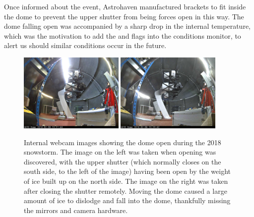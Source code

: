 \begin{colsection}
\begin{colsection}
Once informed about the event, Astrohaven manufactured brackets to fit inside the dome to prevent the upper shutter from being forces open in this way. The dome falling open was accompanied by a sharp drop in the internal temperature, which was the motivation to add the  and  flags into the conditions monitor, to alert us should similar conditions occur in the future.

\begin{figure}[p]
    \begin{center}
        \includegraphics[width=0.45\textwidth]{images/ice_open.jpeg}
        \includegraphics[width=0.45\textwidth]{images/ice_closed.jpeg}
    \end{center}
    \caption[Internal webcam images showing the dome open during a snowstorm]{
        Internal webcam images showing the dome open during the 2018 snowstorm. The image on the left was taken when opening was discovered, with the upper shutter (which normally closes on the south side, to the left of the image) having been open by the weight of ice built up on the north side. The image on the right was taken after closing the shutter remotely. Moving the dome caused a large amount of ice to dislodge and fall into the dome, thankfully missing the mirrors and camera hardware.
    }\label{fig:ice_internal}
\end{figure}


\end{colsection}
\end{colsection}
